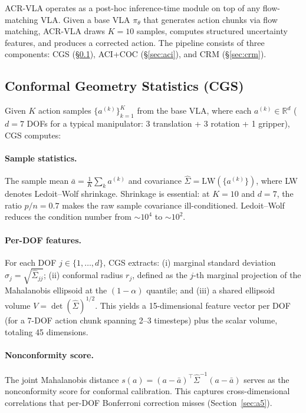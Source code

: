 \documentclass[letterpaper]{article}
\begin{document}
ACR-VLA operates as a post-hoc inference-time module on top of any flow-matching VLA.
Given a base VLA $\pi_\theta$ that generates action chunks via flow matching, ACR-VLA draws $K{=}10$ samples, computes structured uncertainty features, and produces a corrected action.
The pipeline consists of three components: CGS (\S\ref{sec:cgs}), ACI+COC (\S\ref{sec:aci}), and CRM (\S\ref{sec:crm}).

\subsection{Conformal Geometry Statistics (CGS)}
\label{sec:cgs}

Given $K$ action samples $\{a^{(k)}\}_{k=1}^K$ from the base VLA, where each $a^{(k)} \in \mathbb{R}^d$ ($d{=}7$ DOFs for a typical manipulator: 3 translation + 3 rotation + 1 gripper), CGS computes:

\paragraph{Sample statistics.}
The sample mean $\bar{a} = \frac{1}{K}\sum_k a^{(k)}$ and covariance $\hat{\Sigma} = \text{LW}(\{a^{(k)}\})$, where LW denotes Ledoit--Wolf shrinkage.
Shrinkage is essential: at $K{=}10$ and $d{=}7$, the ratio $p/n = 0.7$ makes the raw sample covariance ill-conditioned.
Ledoit--Wolf reduces the condition number from ${\sim}10^4$ to ${\sim}10^2$.

\paragraph{Per-DOF features.}
For each DOF $j \in \{1,\ldots,d\}$, CGS extracts: (i) marginal standard deviation $\sigma_j = \sqrt{\hat{\Sigma}_{jj}}$; (ii) conformal radius $r_j$, defined as the $j$-th marginal projection of the Mahalanobis ellipsoid at the $(1{-}\alpha)$ quantile; and (iii) a shared ellipsoid volume $V = \det(\hat{\Sigma})^{1/2}$.
This yields a 15-dimensional feature vector per DOF (for a 7-DOF action chunk spanning 2--3 timesteps) plus the scalar volume, totaling 45 dimensions.

\paragraph{Nonconformity score.}
The joint Mahalanobis distance $s(a) = (a - \bar{a})^\top \hat{\Sigma}^{-1} (a - \bar{a})$ serves as the nonconformity score for conformal calibration.
This captures cross-dimensional correlations that per-DOF Bonferroni correction misses (Section~\ref{sec:a5}).
\end{document}
